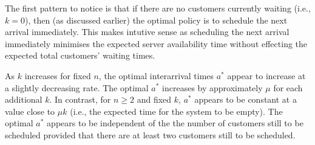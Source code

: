 The first pattern to notice is that if there are no customers currently waiting (i.e., $k = 0$), then (as discussed earlier) the optimal policy is to schedule the next arrival immediately. This makes intutive sense as scheduling the next arrival immediately minimises the expected server availability time without effecting the expected total customers' waiting times.

As $k$ increases for fixed $n$, the optimal interarrival times $a^{*}$ appear to increase at a slightly decreasing rate. The optimal $a^{*}$ increases by approximately $\mu$ for each additional $k$. In contrast, for $n \geq 2$ and fixed $k$, $a^{*}$ appears to be constant at a value close to $\mu k$ (i.e., the expected time for the system to be empty). The optimal $a^{*}$ appears to be independent of the the number of customers still to be scheduled provided that there are at least two customers still to be scheduled.

































